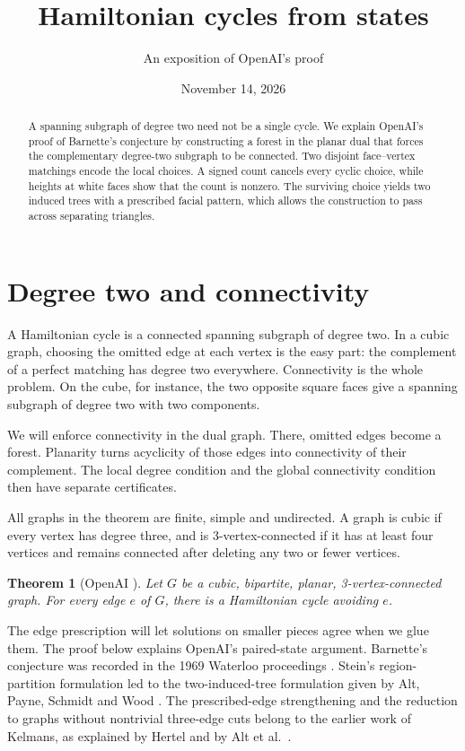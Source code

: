 \documentclass[10pt,a4paper]{amsart}
\title{Hamiltonian cycles from states}
\author{An exposition of OpenAI's proof}
\date{November 14, 2026}
\newtheorem{theorem}{Theorem}
\theoremstyle{remark}
\begin{document}
\begin{abstract}
A spanning subgraph of degree two need not be a single cycle.
We explain OpenAI's proof of Barnette's conjecture by constructing a forest in the planar dual that forces the complementary degree-two subgraph to be connected.
Two disjoint face--vertex matchings encode the local choices.
A signed count cancels every cyclic choice, while heights at white faces show that the count is nonzero.
The surviving choice yields two induced trees with a prescribed facial pattern, which allows the construction to pass across separating triangles.
\end{abstract}
\maketitle

\section{Degree two and connectivity}
A Hamiltonian cycle is a connected spanning subgraph of degree two. In a cubic graph, choosing the omitted edge at each vertex is the easy part: the complement of a perfect matching has degree two everywhere. Connectivity is the whole problem. On the cube, for instance, the two opposite square faces give a spanning subgraph of degree two with two components.

We will enforce connectivity in the dual graph. There, omitted edges become a forest. Planarity turns acyclicity of those edges into connectivity of their complement. The local degree condition and the global connectivity condition then have separate certificates.

All graphs in the theorem are finite, simple and undirected. A graph is cubic if every vertex has degree three, and is 3-vertex-connected if it has at least four vertices and remains connected after deleting any two or fewer vertices.
\begin{theorem}[OpenAI \cite{openai2026}]\label{thm:main}
Let $G$ be a cubic, bipartite, planar, 3-vertex-connected graph. For every edge $e$ of $G$, there is a Hamiltonian cycle avoiding $e$.
\end{theorem}
The edge prescription will let solutions on smaller pieces agree when we glue them. The proof below explains OpenAI's paired-state argument. Barnette's conjecture was recorded in the 1969 Waterloo proceedings \cite{barnette1969}. Stein's region-partition formulation \cite[Theorem 2.2]{stein1971} led to the two-induced-tree formulation given by Alt, Payne, Schmidt and Wood \cite[Lemma 5]{apsw2016}. The prescribed-edge strengthening and the reduction to graphs without nontrivial three-edge cuts belong to the earlier work of Kelmans, as explained by Hertel and by Alt et al.\ \cite{hertel2005,apsw2016}.
\end{document}
